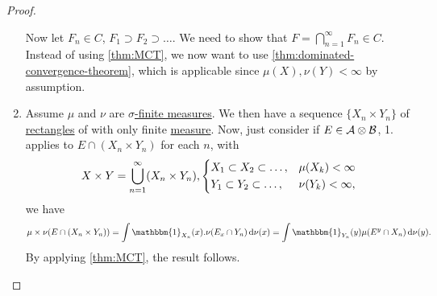 \begin{proof}
\begin{enumerate}
		      \par Now let \(F_{n} \in C\), \(F_1\supset F_2\supset \ldots  \). We need to show that \(F = \bigcap\limits_{n=1}^{\infty} F_{n} \in C\).
		      Instead of using \autoref{thm:MCT}, we now want to use \autoref{thm:dominated-convergence-theorem}, which is applicable since \(\mu (X), \nu (Y)< \infty \)
		      by assumption.
		\item Assume \(\mu\) and \(\nu \) are \hyperref[def:sigma-finite-measure]{\(\sigma \)-finite measures}. We then have a sequence \(\{X_n \times Y_n\}\)
		      of \hyperref[def:rectangle]{rectangles} of with only finite \hyperref[def:measure]{measure}. Now, just consider if \(E\in \mathcal{\MakeUppercase{a}} \otimes \mathcal{\MakeUppercase{b}} \),
		      1. applies to \(E \cap (X_{n} \times Y_{n} )\) for each \(n\), with
		      \[
			      X\times Y = \bigcup\limits_{n=1}^{\infty} (X_{n} \times Y_{n} ), \begin{dcases}
				      X_1\subset X_2\subset \ldots , & \mu (X_{k} )< \infty   \\
				      Y_1\subset Y_2\subset \ldots , & \nu (Y_{k} )< \infty ,
			      \end{dcases}
		      \]
		      we have
		      \[
			      \mu \times \nu (E \cap (X_{n} \times Y_{n} )) = \int \mathbbm{1}_{X_{n} } (x) . \nu (E_{x} \cap Y_{n} )\,\mathrm{d} \nu (x) = \int \mathbbm{1}_{Y_{n} } (y)\mu (E^y \cap X_{n} )\,\mathrm{d} \nu (y).
		      \]
		      By applying \autoref{thm:MCT}, the result follows.
	\end{enumerate}
\end{proof}

